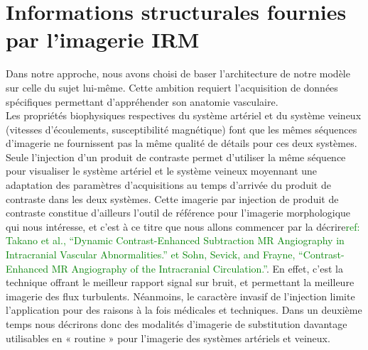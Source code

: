 \section{Informations structurales fournies par l'imagerie IRM}
Dans notre approche, nous avons choisi de baser l’architecture de notre modèle sur celle du sujet lui-même. Cette ambition requiert l’acquisition de données spécifiques permettant d’appréhender son anatomie vasculaire.\\
Les propriétés biophysiques respectives du système artériel et du système veineux (vitesses d’écoulements, susceptibilité magnétique) font que les mêmes séquences d’imagerie ne fournissent pas la même qualité de détails pour ces deux systèmes. Seule l’injection d’un produit de contraste permet d’utiliser la même séquence pour visualiser le système artériel et le système veineux moyennant une adaptation des paramètres d’acquisitions au temps d’arrivée du produit de contraste dans les deux systèmes. Cette imagerie par injection de produit de contraste constitue d’ailleurs l’outil de référence pour l’imagerie morphologique qui nous intéresse, et c’est à ce titre que nous allons commencer par la décrire\textcolor{green}{ref: Takano et al., “Dynamic Contrast-Enhanced Subtraction MR Angiography in Intracranial Vascular Abnormalities.” et Sohn, Sevick, and Frayne, “Contrast-Enhanced MR Angiography of the Intracranial Circulation.”}. En effet, c’est la technique offrant le meilleur rapport signal sur bruit, et permettant la meilleure imagerie des flux turbulents. Néanmoins, le caractère invasif de l’injection limite l’application pour des raisons à la fois médicales et techniques. Dans un deuxième temps nous décrirons donc des modalités d’imagerie de substitution davantage utilisables en « routine » pour l’imagerie des systèmes artériels et veineux.
